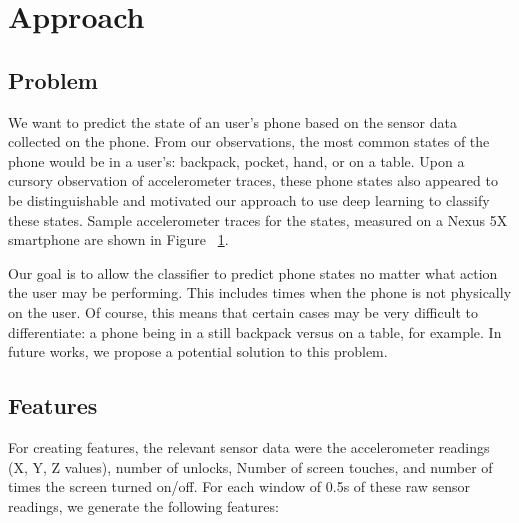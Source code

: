 \section{Approach}

\subsection{Problem}
We want to predict the state of an user's phone based on the sensor data collected on the phone. 
From our observations, the most common states of the phone would be in a user's: backpack, pocket, hand, or on a table.
Upon a cursory observation of accelerometer traces, these phone states also appeared to be distinguishable and motivated
our approach to use deep learning to classify these states.
Sample accelerometer traces for the states, measured on a Nexus 5X
smartphone are shown in Figure ~\ref{fig:AccelDiffStates}.

\begin{figure}
\begin{center}
 \scalebox{0.375}{}
  \scalebox{0.375}{}
  \scalebox{0.375}{}
  \scalebox{0.375}{}
  \label{fig:AccelDiffStates}
\end{center}
\end{figure}


Our goal is to allow the classifier to predict phone states no matter what action the user may be performing.
This includes times when the phone is not physically on the user. 
Of course, this means that certain cases may be very difficult to differentiate: a phone being in a still backpack versus on a table, for example.
In future works, we propose a potential solution to this problem. 


\subsection{Features}
For creating features, the relevant sensor data were the accelerometer readings (X, Y, Z values), number of unlocks, Number of screen touches, and number of times the screen turned on/off. For each window of 0.5s of these raw sensor readings, we generate the following features:

